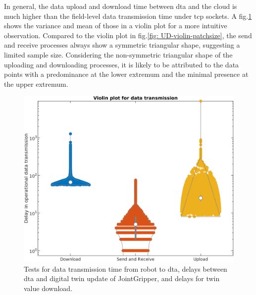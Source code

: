 In general, the data upload and download time between \gls{dta} and the cloud is 
much higher than the field-level data transmission time under \gls{tcp} sockets. 
A fig.\ref{fig: SR-U-D-violin} shows the variance and mean of those in a violin plot 
for a more intuitive observation. 
Compared to the violin plot in fig.\ref{fig: UD-violin-patchsize}, the send and receive 
processes always show a symmetric triangular shape, suggesting a limited sample size. 
Considering the non-symmetric triangular shape of the uploading and downloading processes, 
it is likely to be attributed to the data points with a predominance at the lower extremum 
and the minimal presence at the upper extremum.
\begin{figure}[htb]
    \includegraphics[width=\textwidth]{figures/tests/DT/log_violin_Plot_3cat.png}
    \centering
    \caption{Tests for data transmission time from robot to \gls{dta}, 
    delays between \gls{dta} and digital twin 
    update of JointGripper, and delays for twin value download.\label{fig: SR-U-D-violin}} 
\end{figure}

